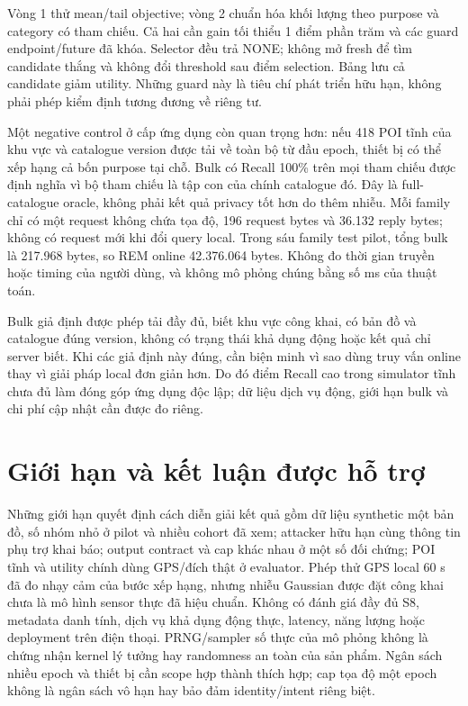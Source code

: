 Vòng 1 thử mean/tail objective; vòng 2 chuẩn hóa khối lượng theo purpose và
category có tham chiếu. Cả hai cần gain tối thiểu 1 điểm phần trăm và các
guard endpoint/future đã khóa. Selector đều trả NONE; không mở fresh để tìm
candidate thắng và không đổi threshold sau điểm selection. Bảng lưu cả
candidate giảm utility. Những guard này là tiêu chí phát triển hữu hạn,
không phải phép kiểm định tương đương về riêng tư.

Một negative control ở cấp ứng dụng còn quan trọng hơn: nếu 418 POI tĩnh
của khu vực và catalogue version được tải về toàn bộ từ đầu epoch, thiết bị
có thể xếp hạng cả bốn purpose tại chỗ. Bulk có Recall 100\% trên mọi tham
chiếu được định nghĩa vì bộ tham chiếu là tập con của chính catalogue đó.
Đây là full-catalogue oracle, không phải kết quả privacy tốt hơn do thêm nhiễu.
Mỗi family chỉ có một request không chứa tọa độ, 196 request bytes và 36.132
reply bytes; không có request mới khi đổi query local. Trong sáu family test
pilot, tổng bulk là 217.968 bytes, so REM online 42.376.064 bytes. Không đo
thời gian truyền hoặc timing của người dùng, và không mô phỏng chúng bằng
số ms của thuật toán.

Bulk giả định được phép tải đầy đủ, biết khu vực công khai, có bản đồ và
catalogue đúng version, không có trạng thái khả dụng động hoặc kết quả chỉ
server biết. Khi các giả định này đúng, cần biện minh vì sao dùng truy vấn
online thay vì giải pháp local đơn giản hơn. Do đó điểm Recall cao trong
simulator tĩnh chưa đủ làm đóng góp ứng dụng độc lập; dữ liệu dịch vụ động,
giới hạn bulk và chi phí cập nhật cần được đo riêng.





\section{Giới hạn và kết luận được hỗ trợ}
\label{sec:current-evaluation-limits}

Những giới hạn quyết định cách diễn giải kết quả gồm dữ liệu synthetic một
bản đồ, số nhóm nhỏ ở pilot và nhiều cohort đã xem; attacker hữu hạn cùng
thông tin phụ trợ khai báo; output contract và cap khác nhau ở một số đối
chứng; POI tĩnh và utility chính dùng GPS/đích thật ở evaluator. Phép thử
GPS local 60 s đã đo nhạy cảm của bước xếp hạng, nhưng nhiễu Gaussian được
đặt công khai chưa là mô hình sensor thực đã hiệu chuẩn. Không có
đánh giá đầy đủ S8, metadata danh tính, dịch vụ khả dụng động thực, latency,
năng lượng hoặc deployment trên điện thoại. PRNG/sampler số thực của mô
phỏng không là chứng nhận kernel lý tưởng hay randomness an toàn của sản phẩm.
Ngân sách nhiều epoch và thiết bị cần scope hợp thành thích hợp; cap tọa độ
một epoch không là ngân sách vô hạn hay bảo đảm identity/intent riêng biệt.

